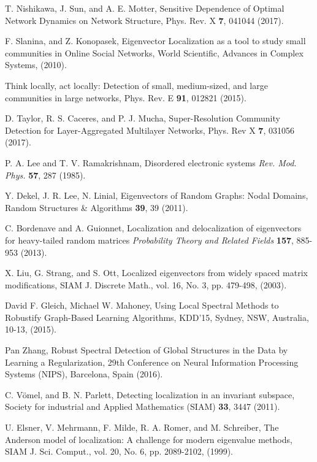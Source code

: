 \documentclass[envcountreset,oribibl]{llncs}
\begin{document}
\begin{thebibliography}{0}
 T. Nishikawa, J. Sun, and A. E. Motter, Sensitive Dependence of Optimal Network Dynamics on Network Structure, Phys. Rev. X {\bf 7}, 041044 (2017).

 F. Slanina, and Z. Konopasek, Eigenvector Localization as a tool to study small communities in Online Social Networks, World Scientific, Advances in Complex Systems, (2010).

 Think locally, act locally: Detection of small, medium-sized, and large communities in large networks, Phys. Rev. E {\bf 91}, 012821 (2015).

 D. Taylor, R. S. Caceres, and P. J. Mucha, Super-Resolution Community Detection for Layer-Aggregated Multilayer Networks, Phys. Rev X {\bf 7}, 031056 (2017).

 P. A. Lee and T. V. Ramakrishnam, Disordered electronic systems {\it Rev. Mod. Phys.} \textbf{57}, 287 (1985).

 Y. Dekel, J. R. Lee, N. Linial, Eigenvectors of Random Graphs: Nodal Domains, Random Structures \& Algorithms {\bf 39}, 39 (2011).

 C. Bordenave and A. Guionnet, Localization and delocalization of eigenvectors for heavy-tailed random matrices {\it Probability Theory and Related Fields} \textbf{157}, 885-953 (2013).

 X. Liu, G. Strang, and S. Ott, Localized eigenvectors from widely spaced matrix modifications,  SIAM J. Discrete Math., 
vol. 16, No. 3, pp. 479-498, (2003).

 David F. Gleich, Michael W. Mahoney, Using Local Spectral Methods to Robustify Graph-Based Learning Algorithms, KDD’15, Sydney, NSW, Australia, 10-13, (2015).

 Pan Zhang, Robust Spectral Detection of Global Structures in the Data by Learning a Regularization, 29th Conference on Neural Information Processing Systems (NIPS), Barcelona, Spain (2016).

 C. V\"{o}mel, and B. N. Parlett, Detecting localization in an invariant subspace, Society for industrial and Applied Mathematics (SIAM) {\bf 33}, 3447 (2011).

U. Elsner, V. Mehrmann, F. Milde, R. A. Romer, and M. Schreiber, The Anderson model of localization: A challenge for modern eigenvalue methods, SIAM J. Sci. Comput., vol. 20, No. 6, pp. 2089-2102, (1999).


\end{thebibliography}
\end{document}
